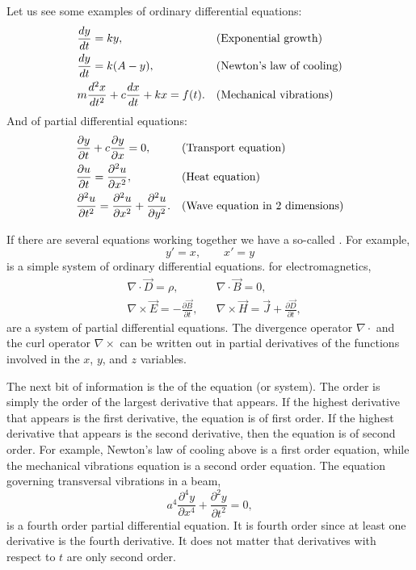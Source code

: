 Let us see some examples of ordinary differential equations:
\begin{align*}
& \frac{d y}{dt} = ky , & & \text{(Exponential growth\index{exponential growth})} \\
& \frac{d y}{dt} = k(A-y) , & & \text{(\myindex{Newton's law of cooling})} \\
& m \frac{d^2 x}{dt^2} + c \frac{dx}{dt} + kx = f(t) . & &
\text{(Mechanical vibrations\index{mechanical vibrations})}
\end{align*}
And of partial differential equations:
\begin{align*}
& \frac{\partial y}{\partial t} + c \frac{\partial y}{\partial x} = 0 , & & 
\text{(Transport equation\index{transport equation})} \\
& \frac{\partial u}{\partial t} = \frac{\partial^2 u}{\partial x^2} , & & 
\text{(Heat equation\index{heat equation})} \\
& \frac{\partial^2 u}{\partial t^2} = \frac{\partial^2 u}{\partial x^2} +
\frac{\partial^2 u}{\partial y^2} . & & 
\text{(Wave equation in 2 dimensions\index{wave equation in 2 dimensions})}
\end{align*}

If there are several equations working together we have a so-called
\emph{}.  For example,
\begin{equation*}
y' = x , \qquad x' = y
\end{equation*}
is a simple system of ordinary differential equations.
 for electromagnetics,
\begin{align*}
& \nabla \cdot \vec{D} = \rho, & & \nabla \cdot \vec{B} = 0 , \\
& \nabla \times \vec{E} = - \frac{\partial \vec{B}}{\partial t}, &
& \nabla \times \vec{H} = \vec{J} + \frac{\partial \vec{D}}{\partial t} ,
\end{align*}
are a system of partial differential equations. 
The divergence operator $\nabla \cdot$ and the
curl operator $\nabla \times$ can be written out in partial derivatives of
the functions involved in the $x$, $y$, and $z$ variables.

\medskip

The next bit of information is the \emph{} of the
equation (or system).  The order is simply the order of the largest
derivative that appears.  If the highest derivative that appears is
the first derivative, the equation is of first order.  If the highest
derivative that appears is the second derivative, then the equation is of second
order.  For example, Newton's law of cooling above is a first order
equation, while the mechanical vibrations equation is a second order equation.
The equation governing transversal vibrations in a beam,
\begin{equation*}
a^4 \frac{\partial^4 y}{\partial x^4} + \frac{\partial^2 y}{\partial t^2} = 0,
\end{equation*}
is a fourth order partial differential equation.  It is
fourth order since at least one derivative is the fourth derivative.  It
does not matter that derivatives with respect to $t$ are only second order.

